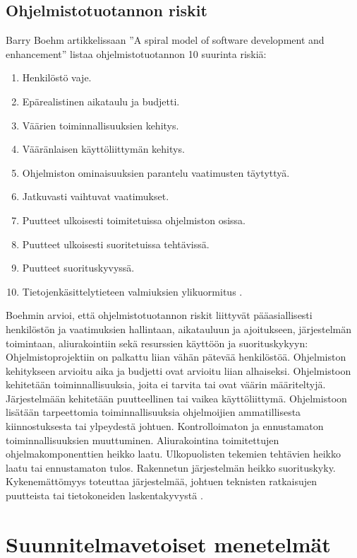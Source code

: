 \documentclass[finnish]{tktltiki2}
\theoremstyle{definition}
\theoremstyle{remark}
\begin{document}
\subsection{Ohjelmistotuotannon riskit}

Barry Boehm artikkelissaan ''A spiral model of software development and enhancement'' listaa ohjelmistotuotannon 10 suurinta riskiä: 

\begin{enumerate}
  \item Henkilöstö vaje.
  \item Epärealistinen aikataulu ja budjetti.
  \item Väärien toiminnallisuuksien kehitys.
  \item Vääränlaisen käyttöliittymän kehitys.
  \item Ohjelmiston ominaisuuksien parantelu vaatimusten täytyttyä.
  \item Jatkuvasti vaihtuvat vaatimukset.
  \item Puutteet ulkoisesti toimitetuissa ohjelmiston osissa.
  \item Puutteet ulkoisesti suoritetuissa tehtävissä.
  \item Puutteet suorituskyvyssä.
  \item Tietojenkäsittelytieteen valmiuksien ylikuormitus \cite{BOE88}.
\end{enumerate}

Boehmin arvioi, että ohjelmistotuotannon riskit liittyvät pääasiallisesti henkilöstön ja vaatimuksien hallintaan, aikatauluun ja ajoitukseen, järjestelmän toimintaan, aliurakointiin sekä resurssien käyttöön ja suorituskykyyn: Ohjelmistoprojektiin on palkattu liian vähän pätevää henkilöstöä. Ohjelmiston kehitykseen arvioitu aika ja budjetti ovat arvioitu liian alhaiseksi. Ohjelmistoon kehitetään toiminnallisuuksia, joita ei tarvita tai ovat väärin määriteltyjä. Järjestelmään kehitetään puutteellinen tai vaikea käyttöliittymä. Ohjelmistoon lisätään tarpeettomia toiminnallisuuksia ohjelmoijien ammatillisesta kiinnostuksesta tai ylpeydestä johtuen. Kontrolloimaton ja ennustamaton toiminnallisuuksien muuttuminen. Aliurakointina toimitettujen ohjelmakomponenttien heikko laatu. Ulkopuolisten tekemien tehtävien heikko laatu tai ennustamaton tulos. Rakennetun järjestelmän heikko suorituskyky. Kykenemättömyys toteuttaa järjestelmää, johtuen teknisten ratkaisujen puutteista tai tietokoneiden laskentakyvystä \cite{BOE88}.   

\section{Suunnitelmavetoiset menetelmät}
\end{document}
